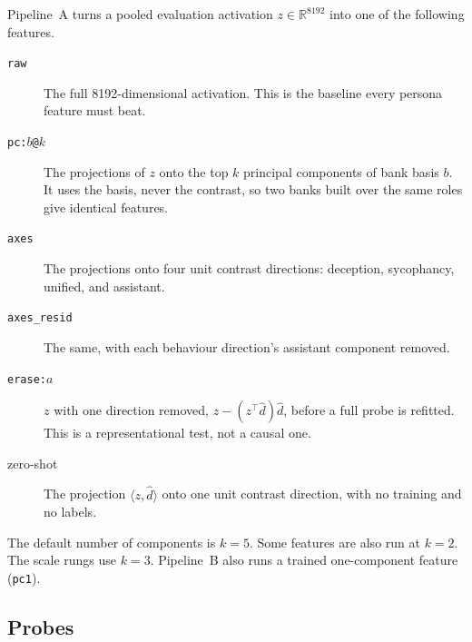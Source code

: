 Pipeline~A turns a pooled evaluation activation $z\in\mathbb{R}^{8192}$ into one of the following features. %
\begin{description}
\item[\texttt{raw}] The full 8192-dimensional activation. This is the baseline every persona feature must beat.
\item[\texttt{pc:}$b$\texttt{@}$k$] The projections of $z$ onto the top $k$ principal components of bank basis $b$. It uses the basis, never the contrast, so two banks built over the same roles give identical features.
\item[\texttt{axes}] The projections onto four unit contrast directions: deception, sycophancy, unified, and assistant.
\item[\texttt{axes\_resid}] The same, with each behaviour direction's assistant component removed.
\item[\texttt{erase:}$a$] $z$ with one direction removed, $z-(z^\top\hat d)\hat d$, before a full probe is refitted. This is a representational test, not a causal one.
\item[zero-shot] The projection $\langle z,\hat d\rangle$ onto one unit contrast direction, with no training and no labels. %
\end{description}

The default number of components is $k=5$. %
Some features are also run at $k=2$. %
The scale rungs use $k=3$. %
Pipeline~B also runs a trained one-component feature (\texttt{pc1}). %

\subsection{Probes}
\label{sec:m-probes}

